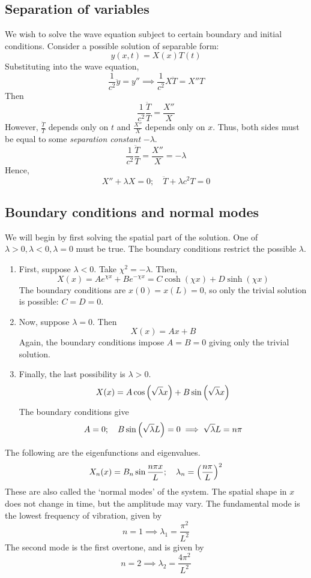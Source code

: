\subsection{Separation of variables}
We wish to solve the wave equation subject to certain boundary and initial conditions.
Consider a possible solution of separable form:
\[
	y(x,t) = X(x) T(t)
\]
Substituting into the wave equation,
\[
	\frac{1}{c^2} \ddot y = y'' \implies \frac{1}{c^2} X \ddot T = X'' T
\]
Then
\[
	\frac{1}{c^2}\frac{\ddot T}{T} = \frac{X''}{X}
\]
However, \( \frac{\ddot T}{T} \) depends only on \( t \) and \( \frac{X''}{X} \) depends only on \( x \).
Thus, both sides must be equal to some \textit{separation constant} \( -\lambda \).
\[
	\frac{1}{c^2}\frac{\ddot T}{T} = \frac{X''}{X} = -\lambda
\]
Hence,
\[
	X'' + \lambda X = 0;\quad \ddot T + \lambda c^2 T = 0
\]

\subsection{Boundary conditions and normal modes}
We will begin by first solving the spatial part of the solution.
One of \( \lambda > 0, \lambda < 0, \lambda = 0 \) must be true.
The boundary conditions restrict the possible \( \lambda \).
\begin{enumerate}
	\item First, suppose \( \lambda < 0 \).
	      Take \( \chi^2 = -\lambda \).
	      Then,
	      \[
		      X(x) = Ae^{\chi x} + Be^{-\chi x} = C \cosh (\chi x) + D \sinh (\chi x)
	      \]
	      The boundary conditions are \( x(0) = x(L) = 0 \), so only the trivial solution is possible: \( C = D = 0 \).
	\item Now, suppose \( \lambda = 0 \).
	      Then
	      \[
		      X(x) = Ax + B
	      \]
	      Again, the boundary conditions impose \( A = B = 0 \) giving only the trivial solution.
	\item Finally, the last possibility is \( \lambda > 0 \).
	      \[
		      X(x) = A \cos \qty(\sqrt{\lambda} x) + B \sin \qty(\sqrt{\lambda} x)
	      \]
	      The boundary conditions give
	      \[
		      A = 0;\quad B \sin \qty(\sqrt{\lambda} L) = 0 \implies \sqrt{\lambda} L = n \pi
	      \]
\end{enumerate}
\noindent The following are the eigenfunctions and eigenvalues.
\[
	X_n(x) = B_n \sin \frac{n \pi x}{L};\quad \lambda_n = \qty(\frac{n \pi}{L})^2
\]
These are also called the `normal modes' of the system.
The spatial shape in \( x \) does not change in time, but the amplitude may vary.
The fundamental mode is the lowest frequency of vibration, given by
\[
	n = 1 \implies \lambda_1 = \frac{\pi^2}{L^2}
\]
The second mode is the first overtone, and is given by
\[
	n = 2 \implies \lambda_2 = \frac{4\pi^2}{L^2}
\]

